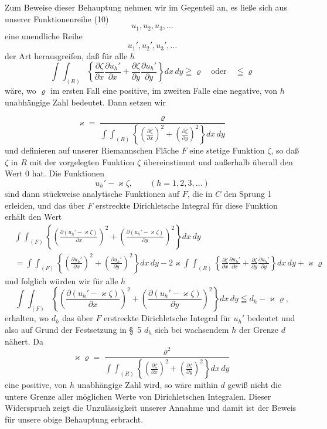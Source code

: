 \documentclass{article}
\begin{document}
Zum Beweise dieser Behauptung nehmen wir im Gegenteil an, es ließe sich aus unserer Funktionenreihe (10)
\[
u_1, u_2, u_3, \dots
\]
eine unendliche Reihe
\[
u_1', u_2', u_3', \dots
\]
der Art herausgreifen, daß für alle $h$
\[
\int\!\!\int_{(R)} \left\{ \frac{\partial\zeta}{\partial x} \frac{\partial u_h'}{\partial x} + \frac{\partial\zeta}{\partial y} \frac{\partial u_h'}{\partial y} \right\} dx\,dy \geqq \varrho \quad \text{oder} \quad \leqq \varrho
\]
wäre, wo $\varrho$ im ersten Fall eine positive, im zweiten Falle eine negative, von $h$ unabhängige Zahl bedeutet. Dann setzen wir

\[
\varkappa = \frac{\varrho}{\displaystyle\int\!\!\int_{(R)} \left\{ \left(\frac{\partial\zeta}{\partial x}\right)^2 + \left(\frac{\partial\zeta}{\partial y}\right)^2 \right\} dx\,dy}
\]
und definieren auf unserer Riemannschen Fläche $F$ eine stetige Funktion $\zeta$, so daß $\zeta$ in $R$ mit der vorgelegten Funktion $\zeta$ übereinstimmt und außerhalb überall den Wert 0 hat. Die Funktionen
\[
u_h' - \varkappa\zeta, \qquad (h = 1, 2, 3, \dots)
\]
sind dann stückweise analytische Funktionen auf $F$, die in $C$ den Sprung 1 erleiden, und das über $F$ erstreckte Dirichletsche Integral für diese Funktion erhält den Wert
\[
\begin{aligned}
& \int\!\!\int_{(F)} \left\{ \left(\frac{\partial (u_h' - \varkappa\zeta)}{\partial x}\right)^2 + \left(\frac{\partial (u_h' - \varkappa\zeta)}{\partial y}\right)^2 \right\} dx\,dy \\
&= \int\!\!\int_{(F)} \left\{ \left(\frac{\partial u_h'}{\partial x}\right)^2 + \left(\frac{\partial u_h'}{\partial y}\right)^2 \right\} dx\,dy - 2\varkappa \int\!\!\int_{(R)} \left\{ \frac{\partial\zeta}{\partial x} \frac{\partial u_h'}{\partial x} + \frac{\partial\zeta}{\partial y} \frac{\partial u_h'}{\partial y} \right\} dx\,dy + \varkappa\varrho
\end{aligned}
\]
und folglich würden wir für alle $h$
\[
\int\!\!\int_{(F)} \left\{ \left(\frac{\partial (u_h' - \varkappa\zeta)}{\partial x}\right)^2 + \left(\frac{\partial (u_h' - \varkappa\zeta)}{\partial y}\right)^2 \right\} dx\,dy \leqq d_h - \varkappa\varrho,
\]
erhalten, wo $d_h$ das über $F$ erstreckte Dirichletsche Integral für $u_h'$ bedeutet und also auf Grund der Festsetzung in §~5 $d_h$ sich bei wachsendem $h$ der Grenze $d$ nähert. Da
\[
\varkappa\varrho = \frac{\varrho^2}{\displaystyle\int\!\!\int_{(R)} \left\{ \left(\frac{\partial\zeta}{\partial x}\right)^2 + \left(\frac{\partial\zeta}{\partial y}\right)^2 \right\} dx\,dy}
\]
eine positive, von $h$ unabhängige Zahl wird, so wäre mithin $d$ gewiß nicht die untere Grenze aller möglichen Werte von Dirichletschen Integralen. Dieser Widerspruch zeigt die Unzulässigkeit unserer Annahme und damit ist der Beweis für unsere obige Behauptung erbracht.
\end{document}
